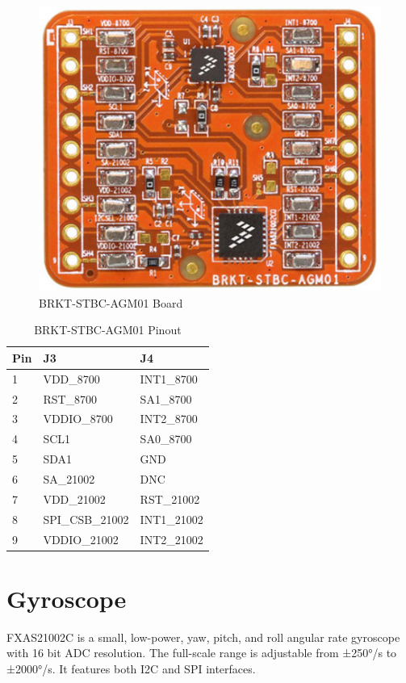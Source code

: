 \documentclass[letterpaper]{report}
\begin{document}
\begin{figure}[H]
	\includegraphics[scale=0.25]{brkt-stbc-agm01}
	\centering
	\caption{BRKT-STBC-AGM01 Board}
\end{figure}

\begin{table}[H]
	\centering
	\begin{tabular}{ | l | l | l |} \hline
	Pin	& J3			&J4			\\ \hline \hline
	1	& VDD\_8700	& INT1\_8700	\\ \hline
	2	& RST\_8700		& SA1\_8700		\\ \hline
	3	& VDDIO\_8700	& INT2\_8700	\\ \hline
	4	& SCL1		& SA0\_8700		\\ \hline
	5	& SDA1		& GND			\\ \hline
	6	& SA\_21002		& DNC			\\ \hline
	7	& VDD\_21002	& RST\_21002	\\ \hline
	8	& SPI\_CSB\_21002	& INT1\_21002	\\ \hline
	9	& VDDIO\_21002	& INT2\_21002	\\ \hline
    \end{tabular}
    \caption{BRKT-STBC-AGM01 Pinout}
\end{table}



\section{Gyroscope}
FXAS21002C is a small, low-power, yaw, pitch, and roll angular rate gyroscope with 16 bit ADC resolution. The full-scale range is adjustable from ±250°/s to ±2000°/s. It features both I2C and SPI interfaces.
\end{document}

